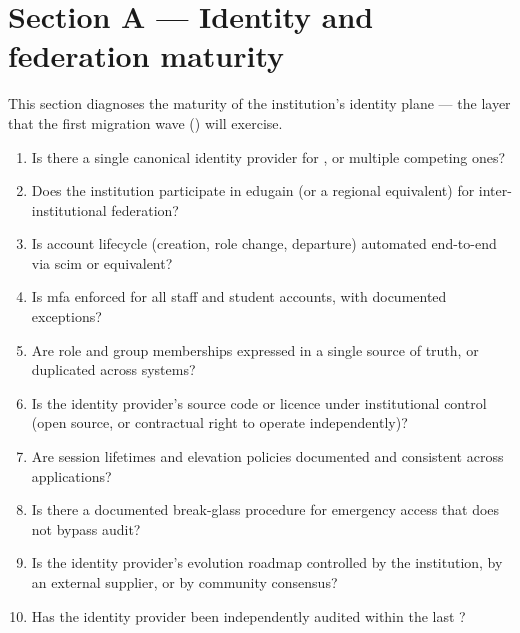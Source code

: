 \section{Section A --- Identity and federation maturity}
\label{sec:sa-identity}

This section diagnoses the maturity of the institution's identity
plane --- the layer that the first migration wave
() will
exercise.

\begin{enumerate}[leftmargin=2em,nosep,label=A\arabic*.]
  \item Is there a single canonical identity provider for
  , or multiple competing ones?

  \item Does the institution participate in \gls{edugain} (or a
  regional equivalent) for inter-institutional federation?

  \item Is account lifecycle (creation, role change, departure)
  automated end-to-end via \gls{scim} or equivalent?

  \item Is \gls{mfa} enforced for all staff and student accounts, with
  documented exceptions?

  \item Are role and group memberships expressed in a single source of
  truth, or duplicated across systems?

  \item Is the identity provider's source code or licence under
  institutional control (open source, or contractual right to operate
  independently)?

  \item Are session lifetimes and elevation policies documented and
  consistent across applications?

  \item Is there a documented break-glass procedure for emergency
  access that does not bypass audit?

  \item Is the identity provider's evolution roadmap controlled by the
  institution, by an external supplier, or by community consensus?

  \item Has the identity provider been independently audited within
  the last ?
\end{enumerate}

